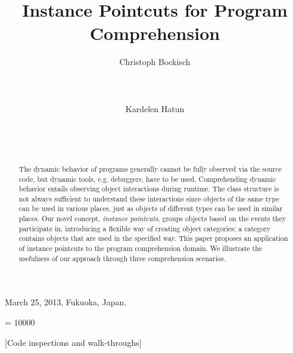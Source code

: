 \documentclass{sig-alternate}
\begin{document}
 {March 25, 2013, Fukuoka, Japan.}

\widowpenalty = 10000

\setlength{\pdfpagewidth}{8.5in}
\setlength{\pdfpageheight}{11in}

\title{Instance Pointcuts for Program Comprehension}

\author{
\alignauthor
Christoph Bockisch\\
       \\
       \\
       \\
\alignauthor
Kardelen Hatun\\
       \\
       \\
       \\
}

\maketitle
\begin{abstract}
The dynamic behavior of programs generally cannot be fully observed via the source code, but dynamic tools, e.g. debuggers, have to be used.
Comprehending dynamic behavior entails observing object interactions during runtime.
The class structure is not always sufficient to understand these interactions since objects of the same type can be used in various places, just as objects of different types can be used in similar places.
Our novel concept, \emph{instance pointcuts}, groups objects based on the events they participate in, introducing a flexible way of creating object categories; a category contains objects that are used in the specified way.
This paper proposes an application of instance pointcuts to the program comprehension domain.
We illustrate the usefulness of our approach through three comprehension scenarios.
\end{abstract}

[Code inspections and walk-throughs]
\end{document}
